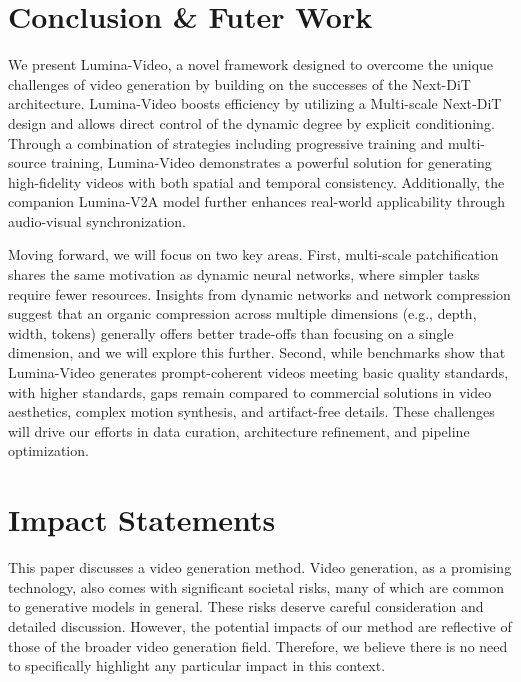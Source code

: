 \section{Conclusion \& Futer Work}
\label{sec:conclusion}

We present Lumina-Video, a novel framework designed to overcome the unique challenges of video generation by building on the successes of the Next-DiT architecture. Lumina-Video boosts efficiency by utilizing a Multi-scale Next-DiT design and allows direct control of the dynamic degree by explicit conditioning. Through a combination of strategies including progressive training and multi-source training, Lumina-Video demonstrates a powerful solution for generating high-fidelity videos with both spatial and temporal consistency. Additionally, the companion Lumina-V2A model further enhances real-world applicability through audio-visual synchronization.

Moving forward, we will focus on two key areas. First, multi-scale patchification shares the same motivation as dynamic neural networks, where simpler tasks require fewer resources. Insights from dynamic networks and network compression suggest that an organic compression across multiple dimensions (e.g., depth, width, tokens) generally offers better trade-offs than focusing on a single dimension, and we will explore this further. Second, while benchmarks show that Lumina-Video generates prompt-coherent videos meeting basic quality standards, with higher standards, gaps remain compared to commercial solutions in video aesthetics, complex motion synthesis, and artifact-free details. These challenges will drive our efforts in data curation, architecture refinement, and pipeline optimization.

\newpage
\section{Impact Statements}
This paper discusses a video generation method. Video generation, as a promising technology, also comes with significant societal risks, many of which are common to generative models in general. These risks deserve careful consideration and detailed discussion. However, the potential impacts of our method are reflective of those of the broader video generation field. Therefore, we believe there is no need to specifically highlight any particular impact in this context.
